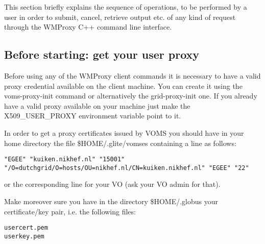 
This section briefly explains the sequence of operations,
to be performed by a user in order to submit, cancel, retrieve output etc.
of any kind of request through the WMProxy C++ command line interface.


\subsection{Before starting: get your user proxy}


Before using any of the WMProxy client commands it is necessary to have
a valid proxy credential available on the client machine. 
You can create it using the voms-proxy-init command or 
alternatively the grid-proxy-init one.
If you already have a valid proxy available on your machine just make the
X509\_USER\_PROXY environment variable point to it.
                                                                                
In order to get a proxy certificates issued by VOMS you
should have in your home directory the file
\$HOME/.glite/vomses containing a line as follows:

\smallskip
{\scriptsize{\verb!"EGEE" "kuiken.nikhef.nl" "15001" "/O=dutchgrid/O=hosts/OU=nikhef.nl/CN=kuiken.nikhef.nl" "EGEE" "22"!}}
\smallskip
                                                                                
or the corresponding line for your VO (ask your VO admin for that).
                                                                                
Make moreover sure you have in the directory \$HOME/.globus your certificate/key pair, 
i.e. the following files:
                                                                                
\smallskip
                                                                                
\begin{scriptsize}
\begin{verbatim}
usercert.pem
userkey.pem
\end{verbatim}
\end{scriptsize}
\smallskip
                                                                                

